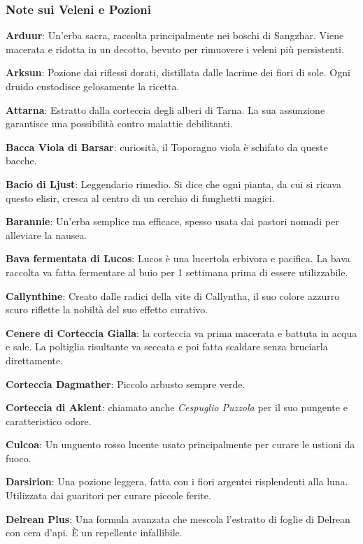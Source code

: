 \begin{multicols}{2}

\subsubsection{Note sui Veleni e Pozioni}

\textbf{Arduur}: Un'erba sacra, raccolta principalmente nei boschi di Sangzhar. Viene macerata e ridotta in un decotto, bevuto per rimuovere i veleni più persistenti.

\textbf{Arksun}: Pozione dai riflessi dorati, distillata dalle lacrime dei fiori di sole. Ogni druido custodisce gelosamente la ricetta.

\textbf{Attarna}: Estratto dalla corteccia degli alberi di Tarna. La sua assunzione garantisce una possibilità contro malattie debilitanti.

\textbf{Bacca Viola di Barsar}: curiosità, il Toporagno viola è schifato da queste bacche.

\textbf{Bacio di Ljust}: Leggendario rimedio. Si dice che ogni pianta, da cui si ricava questo elisir, cresca al centro di un cerchio di funghetti magici.

\textbf{Barannie}: Un'erba semplice ma efficace, spesso usata dai pastori nomadi per alleviare la nausea.

\textbf{Bava fermentata di Lucos}: Lucos è una lucertola erbivora e pacifica. La bava raccolta va fatta fermentare al buio per 1 settimana prima di essere utilizzabile.

\textbf{Callynthine}: Creato dalle radici della vite di Callyntha, il suo colore azzurro scuro riflette la nobiltà del suo effetto curativo.

\textbf{Cenere di Corteccia Gialla}: la corteccia va prima macerata e battuta in acqua e sale. La poltiglia risultante va seccata e poi fatta scaldare senza bruciarla direttamente.

\textbf{Corteccia Dagmather}: Piccolo arbusto sempre verde.

\textbf{Corteccia di Aklent}: chiamato anche \emph{Cespuglio Puzzola} per il suo pungente e caratteristico odore.

\textbf{Culcoa}: Un unguento rosso lucente usato principalmente per curare le ustioni da fuoco.

\textbf{Darsirion}: Una pozione leggera, fatta con i fiori argentei risplendenti alla luna. Utilizzata dai guaritori per curare piccole ferite.

\textbf{Delrean Plus}: Una formula avanzata che mescola l'estratto di foglie di Delrean con cera d'api. È un repellente infallibile.


\end{multicols}
